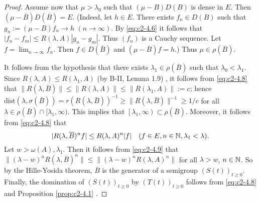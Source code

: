 \begin{proof}
Assume now that $\mu > \lambda_{0}$ such that $(\mu - B)D(B)$ is dense in $E$. 
Then $(\mu - \overline{B})D(\overline{B}) = E$. 
(Indeed, let $h \in E$. 
There exists $f_{n} \in D(B)$ such that $g_{n} := (\mu - B)f_{n} \to h$ $(n \to \infty)$. 
By \eqref{eq:c2-4.6} it follows that $|f_{n} - f_{m}| \leq R(\lambda,A)|g_{n} - g_{m}|$. 
Thus $(f_{n})$ is a Cauchy sequence. 
Let $f = \lim_{n \to \infty} f_{n}$. 
Then $f \in D(\overline{B})$ and $(\mu - \overline{B})f = h$.) 
Thus $\mu \in \rho(\overline{B})$.

It follows from the hypothesis that there exists $\lambda_{1} \in \rho(\overline{B})$ such that $\lambda_{0} < \lambda_{1}$. 
Since $R(\lambda,A) \leq R(\lambda_{1},A)$ (by B-II, Lemma 1.9)
, it follows from \eqref{eq:c2-4.8} that $\|R(\lambda,\overline{B})\| \leq \|R(\lambda,A)\| \leq \|R(\lambda_{1},A)\| := c$; 
hence 
$\text{dist}(\lambda,\sigma(\overline{B})) = r(R(\lambda,\overline{B}))^{-1} \geq \|R(\lambda,\overline{B})\|^{-1} \geq 1/c$ 
for all
$\lambda \in \rho(\overline{B}) \cap [\lambda_{1},\infty)$. 
This implies that $\left[\lambda_{1},\infty\right) \subset \rho(\overline{B})$. Moreover, it follows from \eqref{eq:c2-4.8} that
\begin{equation}\label{eq:c2-4.9}
|R(\lambda,\overline{B})^{n}f| \leq R(\lambda,A)^{n}|f| \quad (f \in E, n \in \mathbb{N} , \lambda_{1} < \lambda).
\end{equation}
Let $w > \omega(A), \lambda_{1}$. 
Then it follows from \eqref{eq:c2-4.9} that
$\|(\lambda - w)^{n}R(\lambda,\overline{B})^{n}\| \leq \|(\lambda - w)^{n}R(\lambda,A)^{n}\|$ for all $\lambda > w$, $n \in \mathbb{N} $. 
So by the Hille-Yosida theorem, $\overline{B}$ is the generator of a semigroup $(S(t))_{t \geq 0}$. 
Finally, the domination of $(S(t))_{t \geq 0}$ by $(T(t))_{t \geq 0}$ follows from \eqref{eq:c2-4.8} and  Proposition \ref{prop:c2-4.1} .
\end{proof}

